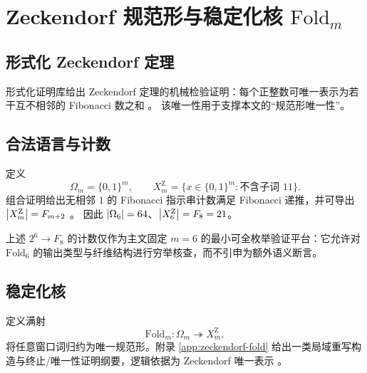 \section{Zeckendorf 规范形与稳定化核 \texorpdfstring{$\mathrm{Fold}_m$}{Fold\_m}}
\label{sec:zeckendorf}

\subsection{形式化 Zeckendorf 定理}

形式化证明库给出 Zeckendorf 定理的机械检验证明：每个正整数可唯一表示为若干互不相邻的 Fibonacci 数之和 \cite{AFPZeckendorf}。
该唯一性用于支撑本文的“规范形唯一性”。

\subsection{合法语言与计数}

定义
\[
\Omega_m=\{0,1\}^{m},\qquad
X_m^{\mathrm Z}=\{x\in\{0,1\}^{m}:\text{不含子词 }11\}.
\]
组合证明给出无相邻 $1$ 的 Fibonacci 指示串计数满足 Fibonacci 递推，并可导出 $\left\lvert X_m^{\mathrm Z}\right\rvert=F_{m+2}$ \cite{PlanetMathZeckendorfCombinatorial}。
因此 $\left\lvert \Omega_6\right\rvert=64$、$\left\lvert X_6^{\mathrm Z}\right\rvert=F_8=21$。

\begin{remark}
上述 $2^6\to F_8$ 的计数仅作为主文固定 $m=6$ 的最小可全枚举验证平台：它允许对 $\mathrm{Fold}_6$ 的输出类型与纤维结构进行穷举核查，而不引申为额外语义断言。
\end{remark}

\subsection{稳定化核}

定义满射
\[
\mathrm{Fold}_m:\Omega_m\twoheadrightarrow X_m^{\mathrm Z},
\]
将任意窗口词归约为唯一规范形。附录 \ref{app:zeckendorf-fold} 给出一类局域重写构造与终止/唯一性证明纲要，逻辑依据为 Zeckendorf 唯一表示 \cite{AFPZeckendorf}。

